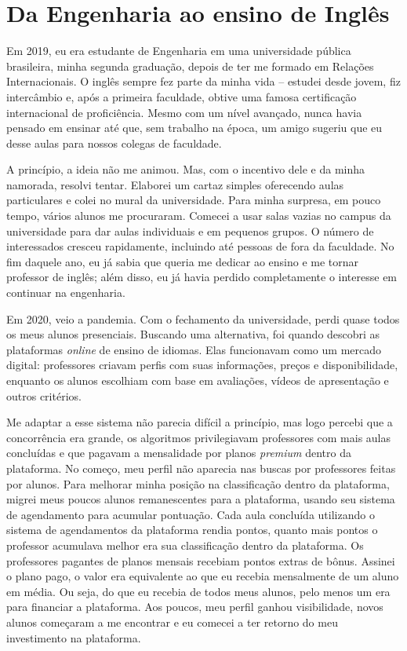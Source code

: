 \documentclass[portuguese]{textolivre}
\begin{document}
\section{Da Engenharia ao ensino de Inglês}
Em 2019, eu era estudante de Engenharia em uma universidade pública brasileira, minha segunda graduação, depois de ter me formado em Relações Internacionais. O inglês sempre fez parte da minha vida -- estudei desde jovem, fiz intercâmbio e, após a primeira faculdade, obtive uma famosa certificação internacional de proficiência. Mesmo com um nível avançado, nunca havia pensado em ensinar até que, sem trabalho na época, um amigo sugeriu que eu desse aulas para nossos colegas de faculdade.

A princípio, a ideia não me animou. Mas, com o incentivo dele e da minha namorada, resolvi tentar. Elaborei um cartaz simples oferecendo aulas particulares e colei no mural da universidade. Para minha surpresa, em pouco tempo, vários alunos me procuraram. Comecei a usar salas vazias no campus da universidade para dar aulas individuais e em pequenos grupos. O número de interessados cresceu rapidamente, incluindo até pessoas de fora da faculdade. No fim daquele ano, eu já sabia que queria me dedicar ao ensino e me tornar professor de inglês; além disso, eu já havia perdido completamente o interesse em continuar na engenharia.

Em 2020, veio a pandemia. Com o fechamento da universidade, perdi quase todos os meus alunos presenciais. Buscando uma alternativa, foi quando descobri as plataformas \textit{online} de ensino de idiomas. Elas funcionavam como um mercado digital: professores criavam perfis com suas informações, preços e disponibilidade, enquanto os alunos escolhiam com base em avaliações, vídeos de apresentação e outros critérios.

Me adaptar a esse sistema não parecia difícil a princípio, mas logo percebi que a concorrência era grande, os algoritmos privilegiavam professores com mais aulas concluídas e que pagavam a mensalidade por planos \textit{premium} dentro da plataforma. No começo, meu perfil não aparecia nas buscas por professores feitas por alunos. Para melhorar minha posição na classificação dentro da plataforma, migrei meus poucos alunos remanescentes para a plataforma, usando seu sistema de agendamento para acumular pontuação. Cada aula concluída utilizando o sistema de agendamentos da plataforma rendia pontos, quanto mais pontos o professor acumulava melhor era sua classificação dentro da plataforma. Os professores pagantes de planos mensais recebiam pontos extras de bônus. Assinei o plano pago, o valor era equivalente ao que eu recebia mensalmente de um aluno em média. Ou seja, do que eu recebia de todos meus alunos, pelo menos um era para financiar a plataforma. Aos poucos, meu perfil ganhou visibilidade, novos alunos começaram a me encontrar e eu comecei a ter retorno do meu investimento na plataforma.
\end{document}
